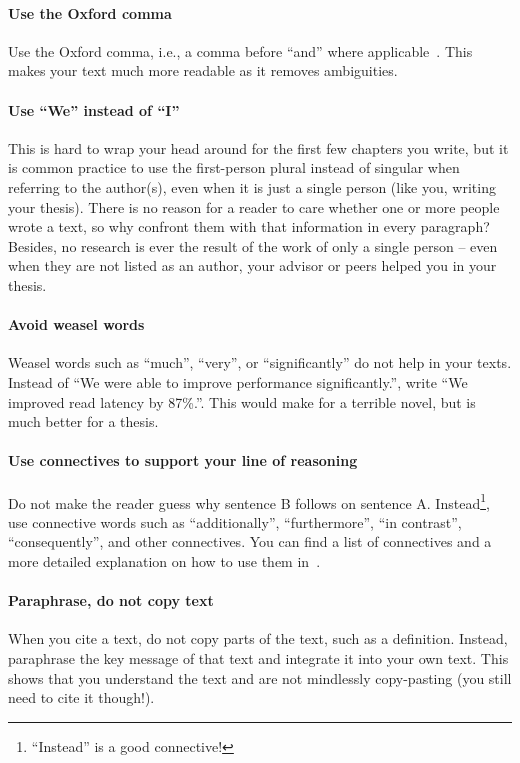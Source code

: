 \documentclass[a4]{article}
\begin{document}
\paragraph{Use the Oxford comma}
Use the Oxford comma, i.e., a comma before ``and'' where applicable~\cite{oxfordcomma}.
This makes your text much more readable as it removes ambiguities.

\paragraph{Use ``We'' instead of ``I''}
This is hard to wrap your head around for the first few chapters you write, but it is common practice to use the first-person plural instead of singular when referring to the author(s), even when it is just a single person (like you, writing your thesis).
There is no reason for a reader to care whether one or more people wrote a text, so why confront them with that information in every paragraph?
Besides, no research is ever the result of the work of only a single person -- even when they are not listed as an author, your advisor or peers helped you in your thesis.

\paragraph{Avoid weasel words}
Weasel words such as ``much'', ``very'', or ``significantly'' do not help in your texts.
Instead of ``We were able to improve performance significantly.'', write ``We improved read latency by 87\%.''.
This would make for a terrible novel, but is much better for a thesis.

\paragraph{Use connectives to support your line of reasoning}
Do not make the reader guess why sentence B follows on sentence A.
Instead\footnote{``Instead'' is a good connective!}, use connective words such as ``additionally'', ``furthermore'', ``in contrast'', ``consequently'', and other connectives.
You can find a list of connectives and a more detailed explanation on how to use them in~\cite{connectives}.

\paragraph{Paraphrase, do not copy text}
When you cite a text, do not copy parts of the text, such as a definition.
Instead, paraphrase the key message of that text and integrate it into your own text.
This shows that you understand the text and are not mindlessly copy-pasting (you still need to cite it though!).
\end{document}
